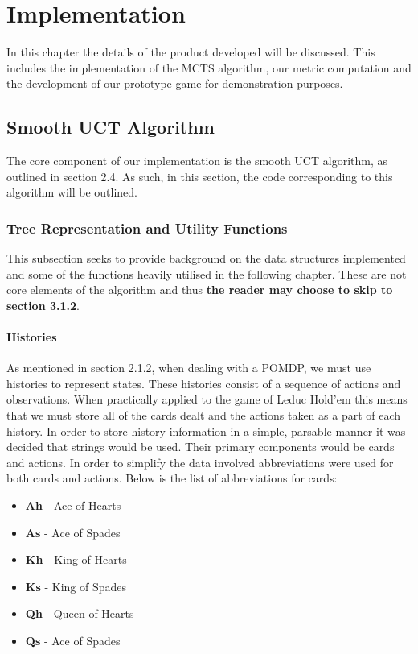 \chapter{Implementation}\label{ch:development}
In this chapter the details of the product developed will be discussed.
This includes the implementation of the MCTS algorithm, our metric computation and
the development of our prototype game for demonstration purposes.


\section{Smooth UCT Algorithm}\label{sec:MCTS}
The core component of our implementation is the smooth UCT algorithm, as
outlined in section 2.4.
As such, in this section, the code corresponding to this algorithm will be outlined.

\subsection{Tree Representation and Utility Functions}\label{subsec:treeRepresentation}
This subsection seeks to provide background on the data structures implemented and some
of the functions heavily utilised in the following chapter.
These are not core elements of the algorithm and thus \textbf{the reader may choose to skip
to section 3.1.2}.

\subsubsection{Histories}
As mentioned in section 2.1.2, when dealing with a POMDP, we must use histories to represent states.
These histories consist of a sequence of actions and observations\citep{silver2010monte}.
When practically applied to the game of Leduc Hold'em this means that we must store all of the
cards dealt and the actions taken as a part of each history.
In order to store history information in a simple, parsable manner it was decided that strings would be used.
Their primary components would be cards and actions.
In order to simplify the data involved abbreviations were used for both cards and actions.
Below is the list of abbreviations for cards:

\begin{itemize}
    \item \textbf{Ah} - Ace of Hearts
    \item \textbf{As} - Ace of Spades
    \item \textbf{Kh} - King of Hearts
    \item \textbf{Ks} - King of Spades
    \item \textbf{Qh} - Queen of Hearts
    \item \textbf{Qs} - Ace of Spades
\end{itemize}

